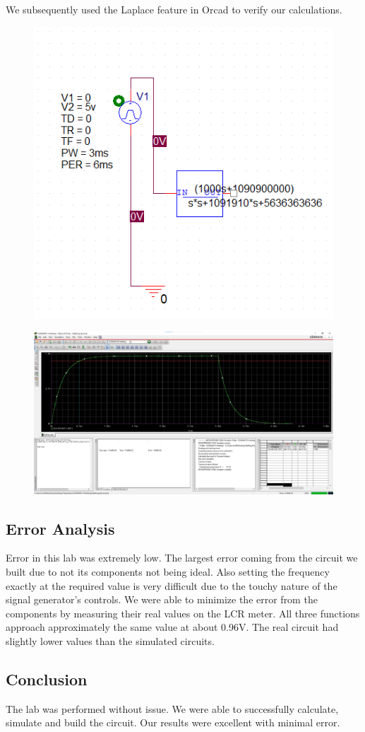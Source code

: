 \documentclass[11pt]{article}
\begin{document}
	We subsequently used the Laplace feature in Orcad to verify our calculations. 
	
		\begin{figure}[H]
		\centering
		\includegraphics[width=5in]{images/simulation_schematic.png}
		\end{figure}
		\begin{figure}[H]
		\centering
		\includegraphics[width=5in]{images/laplace_part.png}
		\end{figure}
	

	\subsection*{Error Analysis}
	Error in this lab was extremely low. The largest error coming from the circuit we built due to not its components not being ideal. Also setting the frequency exactly at the required value is very difficult due to the touchy nature of the signal generator's controls. We were able to minimize the error from the components by measuring their real values on the LCR meter. All three functions approach approximately the same value at about 0.96V. The real circuit had slightly lower values than the simulated circuits.
	\subsection*{Conclusion}
	The lab was performed without issue. We were able to successfully calculate, simulate and build the circuit. Our results were excellent with minimal error. 
	
	
\end{document}
